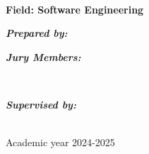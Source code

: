 \begin{titlepage}
\HRule \\[0.3cm]
{ 
\huge{\bfseries{\reporttitle}}\\[0.5cm]

}
\HRule \\[0.3cm]

\textbf{\large Field: Software Engineering \coursename}\\[0.5cm]

\vspace{0.5cm}

\begin{minipage}[t]{0.45\textwidth}
  \begin{flushleft} \large
  \emph{\textbf{Prepared by:}}\\
  \studentname
  
  \vspace{1.5cm}
  \emph{\textbf{Jury Members:}} \\
  \jurymembers
  \end{flushleft}
\end{minipage}
  ~
\begin{minipage}[t]{0.5\textwidth}
  \begin{flushleft} \large
  \emph{\textbf{Supervised by:}} \\
  \teachername
  \end{flushleft}
\end{minipage}
\\[2cm]
  

{\large Academic year 2024-2025}\\[2cm]


\vfill
\end{titlepage}
\pagebreak